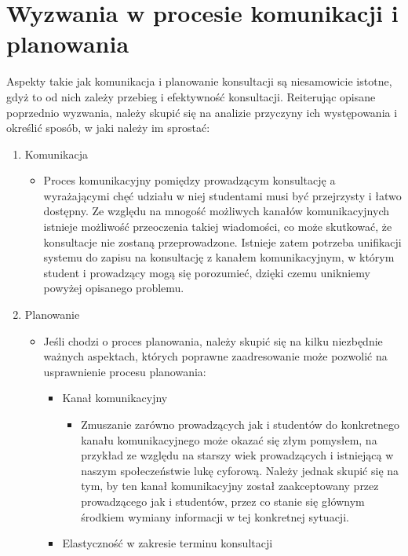 \section{Wyzwania w procesie komunikacji i planowania}
Aspekty takie jak komunikacja i planowanie konsultacji są niesamowicie istotne, gdyż to od nich zależy przebieg i efektywność konsultacji. Reiterując opisane poprzednio wyzwania, należy skupić się na analizie przyczyny ich występowania i określić sposób, w jaki należy im sprostać:
\begin{enumerate}
    \item Komunikacja
        \begin{itemize}
            \item[] Proces komunikacyjny pomiędzy prowadzącym konsultację a wyrażającymi chęć udziału w niej studentami musi być przejrzysty i łatwo dostępny. Ze względu na mnogość możliwych kanałów komunikacyjnych istnieje możliwość przeoczenia takiej wiadomości, co może skutkować, że konsultacje nie zostaną przeprowadzone. Istnieje zatem potrzeba unifikacji systemu do zapisu na konsultację z kanałem komunikacyjnym, w którym student i prowadzący mogą się porozumieć, dzięki czemu unikniemy powyżej opisanego problemu.
        \end{itemize}
    \item Planowanie
        \begin{itemize}
            \item[] Jeśli chodzi o proces planowania, należy skupić się na kilku niezbędnie ważnych aspektach, których poprawne zaadresowanie może pozwolić na usprawnienie procesu planowania:
            \begin{itemize}
                \item Kanał komunikacyjny
                    \begin{itemize}
                        \item[] Zmuszanie zarówno prowadzących jak i studentów do konkretnego kanału komunikacyjnego może okazać się złym pomysłem, na przykład ze względu na starszy wiek prowadzących i istniejącą w naszym społeczeństwie lukę cyforową. Należy jednak skupić się na tym, by ten kanał komunikacyjny został zaakceptowany przez prowadzącego jak i studentów, przez co stanie się głównym środkiem wymiany informacji w tej konkretnej sytuacji.
                    \end{itemize}
    \newpage
                \item Elastyczność w zakresie terminu konsultacji
                    \begin{itemize}

\end{itemize}
\end{itemize}
\end{itemize}
\end{enumerate}
